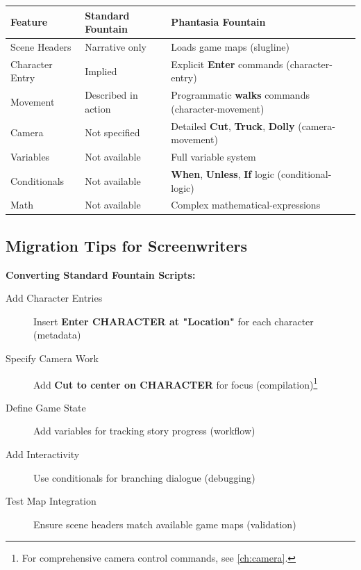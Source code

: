 \documentclass[11pt,letterpaper,oldstylefigures]{memoir}
\newcommand{\fountain}[1]{\textbf{#1}}
\begin{document}
\begin{center}
\begin{tabular}{|l|l|l|}
\hline
\textbf{Feature} & \textbf{Standard Fountain} & \textbf{Phantasia Fountain} \\
\hline
Scene Headers & Narrative only & Loads game maps (\gls{slugline}) \\
Character Entry & Implied & Explicit \fountain{Enter} commands (\gls{character-entry}) \\
Movement & Described in action & Programmatic \fountain{walks} commands (\gls{character-movement}) \\
Camera & Not specified & Detailed \fountain{Cut}, \fountain{Truck}, \fountain{Dolly} (\gls{camera-movement}) \\
Variables & Not available & Full \gls{variable} system \\
Conditionals & Not available & \fountain{When}, \fountain{Unless}, \fountain{If} logic (\gls{conditional-logic}) \\
Math & Not available & Complex \gls{mathematical-expression}s \\
\hline
\end{tabular}
\end{center}

\subsection{Migration Tips for Screenwriters}

\textbf{Converting Standard Fountain Scripts:}
\begin{description}
\item[Add Character Entries] Insert \fountain{Enter CHARACTER at "Location"} for each character (\gls{metadata})
\item[Specify Camera Work] Add \fountain{Cut to center on CHARACTER} for focus (\gls{compilation})\footnote{For comprehensive camera control commands, see \autoref{ch:camera}.}
\item[Define Game State] Add variables for tracking story progress (\gls{workflow})
\item[Add Interactivity] Use conditionals for branching dialogue (\gls{debugging})
\item[Test Map Integration] Ensure scene headers match available game maps (\gls{validation})
\end{description}
\end{document}
